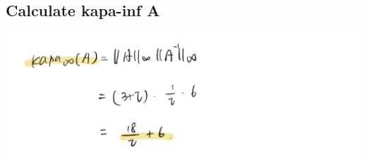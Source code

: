 \documentclass{article}
\begin{document}
\subsection{Calculate kapa-inf A}
\includegraphics[width=1\linewidth]{pr4-10}
\end{document}
